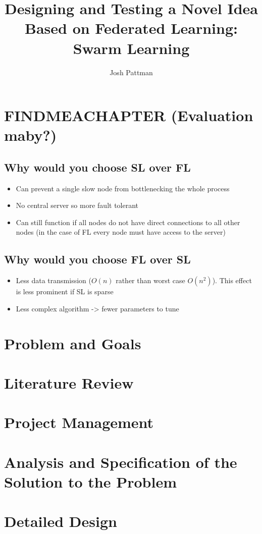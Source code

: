 \documentclass[12pt,a4paper]{report}
\author{Josh Pattman}
\title{Designing and Testing a Novel Idea Based on Federated Learning: Swarm Learning}
\begin{document}
	\maketitle
	\tableofcontents
	\chapter{FINDMEACHAPTER (Evaluation maby?)}
	\section{Why would you choose SL over FL}
	\begin{itemize}
		\item Can prevent a single slow node from bottlenecking the whole process
		\item No central server so more fault tolerant
		\item Can still function if all nodes do not have direct connections to all other nodes (in the case of FL every node must have access to the server)
	\end{itemize}
	\section{Why would you choose FL over SL}
	\begin{itemize}
		\item Less data transmission ($O(n)$ rather than worst case $O(n^2)$). This effect is less prominent if SL is sparse
		\item Less complex algorithm -> fewer parameters to tune
	\end{itemize}

	\chapter{Problem and Goals}
	\chapter{Literature Review}
	\chapter{Project Management}
	\chapter{Analysis and Specification of the Solution to the Problem}
	\chapter{Detailed Design}
	
	
\end{document}
